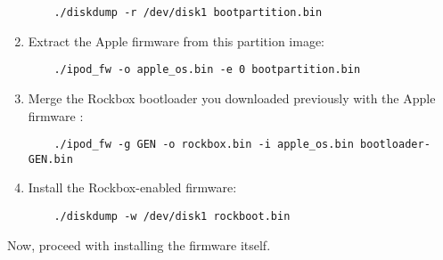 \begin{enumerate}
\begin{verbatim}
    ./diskdump -r /dev/disk1 bootpartition.bin
    \end{verbatim}
  \item Extract the Apple firmware from this partition image:
    \begin{verbatim}
    ./ipod_fw -o apple_os.bin -e 0 bootpartition.bin
    \end{verbatim}

  \item Merge the Rockbox bootloader you downloaded previously with the Apple
    firmware :
    \begin{verbatim}
    ./ipod_fw -g GEN -o rockbox.bin -i apple_os.bin bootloader-GEN.bin
    \end{verbatim}
  \item
    Install the Rockbox-enabled firmware:
    \begin{verbatim}
    ./diskdump -w /dev/disk1 rockboot.bin
    \end{verbatim}
\end{enumerate}

Now, proceed with installing the firmware itself.

